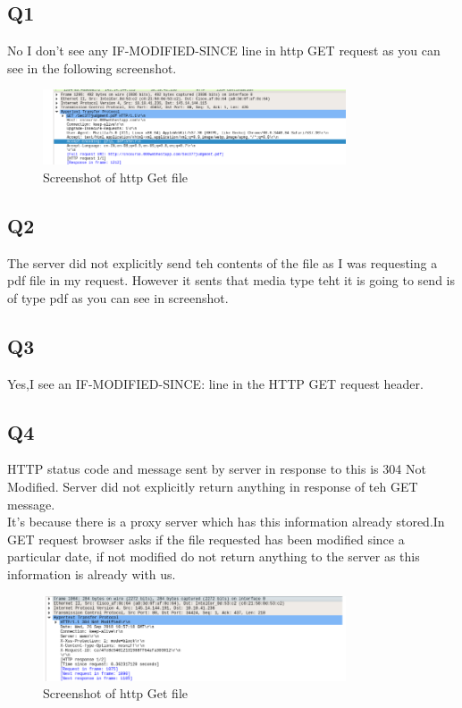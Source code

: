 \documentclass{article}
\begin{document}
\subsection{Q1}
No I don’t see any IF-MODIFIED-SINCE line in http GET request as you can see in the following screenshot.\\
  \begin{figure}[H]
 \centering
 \includegraphics[width=0.8\textwidth]{../Set2/q1/a.png}
 \caption{\label{fig:PING}Screenshot of http Get file}
 \end{figure}
\subsection{Q2}
The server did not explicitly send teh contents of the file as I was requesting a pdf file in my request. However it sents that media type teht it is going to send is of type pdf as you can see in screenshot.\\
\subsection{Q3}
Yes,I see an IF-MODIFIED-SINCE: line in the HTTP GET request header.\\
\subsection{Q4}
HTTP status code and message sent by server in response to this is 304 Not Modified. Server did not explicitly return anything in response of teh GET message.\\
It’s because there is a proxy server which has this information already stored.In GET request browser asks if the file requested has been modified since a particular date, if not modified do not return anything to the server as this information is already with us.\\
  \begin{figure}[H]
 \centering
 \includegraphics[width=0.8\textwidth]{../Set2/q4/a.png}
 \caption{\label{fig:PING}Screenshot of http Get file}
 \end{figure}
\end{document}
